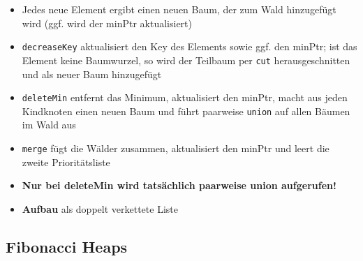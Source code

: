 	\begin{itemize}
		\item Jedes neue Element ergibt einen neuen Baum, der zum Wald hinzugefügt wird (ggf. wird der minPtr aktualisiert)
		\item \texttt{decreaseKey} aktualisiert den Key des Elements sowie ggf. den minPtr; ist das Element keine Baumwurzel, so wird der Teilbaum per \texttt{cut} herausgeschnitten und als neuer Baum hinzugefügt
		\item \texttt{deleteMin} entfernt das Minimum, aktualisiert den minPtr, macht aus jeden Kindknoten einen neuen Baum und führt paarweise \texttt{union} auf allen Bäumen im Wald aus
		\item \texttt{merge} fügt die Wälder zusammen, aktualisiert den minPtr und leert die zweite Prioritätsliste
		\item \textbf{Nur bei deleteMin wird tatsächlich paarweise union aufgerufen!}
		\item \textbf{Aufbau} als doppelt verkettete Liste
	\end{itemize}

	\newpage
	\subsection{Fibonacci Heaps}%
	\label{pl:sub:fibonacci_heaps}
	
